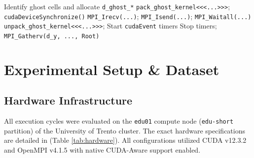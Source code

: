 \documentclass[conference]{IEEEtran}
\begin{document}
\begin{algorithm}[htbp]
\footnotesize
\DontPrintSemicolon
\SetAlgoLined
{} 
Identify ghost cells and allocate \texttt{d\_ghost\_*}\;
\texttt{pack\_ghost\_kernel<<<...>>>}; \texttt{cudaDeviceSynchronize()}\;
\texttt{MPI\_Irecv(...)}; \texttt{MPI\_Isend(...)}; \texttt{MPI\_Waitall(...)}\;
\texttt{unpack\_ghost\_kernel<<<...>>>}; Start \texttt{cudaEvent} timers\;
Stop timers; \texttt{MPI\_Gatherv(d\_y, ..., Root)}\;
\caption{Distributed GPU-Aware SpMV Pipeline}
\label{alg:spmv_pipeline}
\end{algorithm}
\section{Experimental Setup \& Dataset}

\subsection{Hardware Infrastructure}
All execution cycles were evaluated on the \texttt{edu01} compute node (\texttt{edu-short} partition) of the University of Trento cluster. The exact hardware specifications are detailed in (Table \ref{tab:hardware}). All configurations utilized CUDA v12.3.2 and OpenMPI v4.1.5 with native CUDA-Aware support enabled.

\begin{table}[htbp]
\caption{Target Hardware Specifications}
\label{tab:hardware}
\centering
{}
\end{table}
\end{document}
